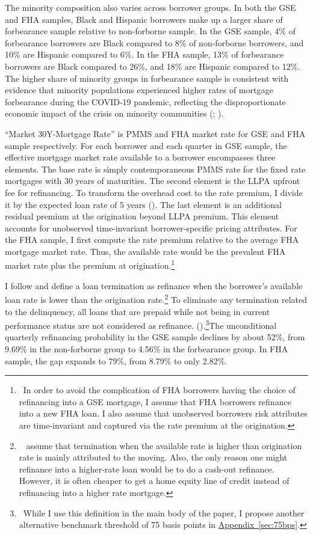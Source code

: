 \documentclass[11pt]{article}
\begin{document}
The minority composition also varies across borrower groups. In both the GSE and FHA samples, Black and Hispanic borrowers make up a larger share of forbearance sample relative to non-forborne sample. In the GSE sample, 4\% of forbearance borrowers are Black compared to 8\% of non-forborne borrowers, and 10\% are Hispanic compared to 6\%. In the FHA sample, 13\% of forbearance borrowers are Black compared to 26\%, and 18\% are Hispanic compared to 12\%. The higher share of minority groups in forbearance sample is consistent with evidence that minority populations experienced higher rates of mortgage forbearance during the COVID-19 pandemic, reflecting the disproportionate economic impact of the crisis on minority communities (\citet{cherry2021government};  \citet{an2022inequality}). 

``Market 30Y-Mortgage Rate'' is PMMS and FHA market rate for GSE and FHA sample respectively. For each borrower and each quarter in GSE sample, the effective mortgage market rate available to a borrower encompasses three elements. The base rate is simply contemporaneous PMMS rate for the fixed rate mortgages with 30 years of maturities. The second element is the LLPA upfront fee for refinancing. To transform the overhead cost to the rate premium, I divide it by the expected loan rate of 5 years (\citet{bhutta2024paying}). The last element is  an additional residual premium at the origination beyond LLPA premium. This element accounts for unobserved time-invariant borrower-specific pricing attributes. For the FHA sample, I first compute the rate premium relative to the average FHA mortgage market rate. Thus, the available rate would be the prevalent FHA market rate plus the premium at origination.\footnote{~In order to avoid the complication of FHA borrowers having the choice of refinancing into a GSE
mortgage, I assume that FHA borrowers refinance into a new FHA loan. I also assume that unobserved borrowers risk attributes are time-invariant and captured via the rate premium at the origination.} 

I follow \citet{berger2024optimal} and define a loan termination as refinance when the borrower's available loan rate is lower than the origination rate.\footnote{ ~\citet{berger2024optimal} assume that termination when the available rate is higher than origination rate is mainly attributed to the moving. Also, the only reason one might refinance into a higher-rate loan would be to do a cash-out refinance. However, it is often cheaper to get a home equity line of credit instead of refinancing into a higher rate mortgage.} To eliminate any termination related to the delinquency, all loans that are prepaid while not being in current performance status are not considered as refinance.  (\citet{gerardi2023mortgage}).\footnote{~While I use this definition in the main body of the paper, I propose another alternative benchmark threshold of 75 basis points in \hyperref[sec:75bps]{Appendix~\ref*{sec:75bps}}.}The unconditional quarterly refinancing probability in the GSE sample declines by about 52\%, from 9.69\% in the non-forborne group to 4.56\% in the forbearance group. In FHA sample, the gap expands to 79\%, from 8.79\% to only 2.82\%. 
\end{document}

